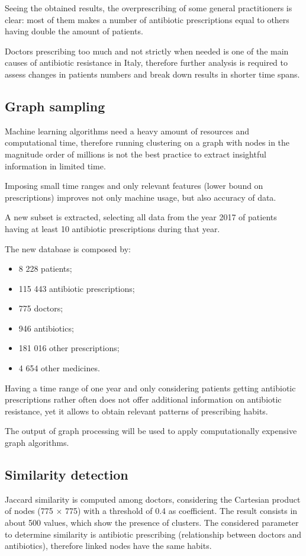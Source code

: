 Seeing the obtained results, the overprescribing of some general practitioners is clear: most of them makes a number of antibiotic prescriptions equal to others having double the amount of patients.

Doctors prescribing too much and not strictly when needed is one of the main causes of antibiotic resistance in Italy, therefore further analysis is required to assess changes in patients numbers and break down results in shorter time spans.

\subsection{Graph sampling}
Machine learning algorithms need a heavy amount of resources and computational time, therefore running clustering on a graph with nodes in the magnitude order of millions is not the best practice to extract insightful information in limited time.

Imposing small time ranges and only relevant features (lower bound on prescriptions) improves not only machine usage, but also accuracy of data. 

A new subset is extracted, selecting all data from the year 2017 of patients having at least 10 antibiotic prescriptions during that year.

The new database is composed by:
\begin{itemize}
	\item 8 228 patients;
	\item 115 443 antibiotic prescriptions;
	\item 775 doctors;
	\item 946 antibiotics;
	\item 181 016 other prescriptions;
	\item 4 654 other medicines.
\end{itemize}

Having a time range of one year and only considering patients getting antibiotic prescriptions rather often does not offer additional information on antibiotic resistance, yet it allows to obtain relevant patterns of prescribing habits.

The output of graph processing will be used to apply computationally expensive graph algorithms. 

\subsection{Similarity detection}
Jaccard similarity is computed among doctors, considering the Cartesian product of nodes (775 $\times$ 775) with a threshold of 0.4 as coefficient. The result consists in about 500 values, which show the presence of clusters. The considered parameter to determine similarity is antibiotic prescribing (relationship between doctors and antibiotics), therefore linked nodes have the same habits.

